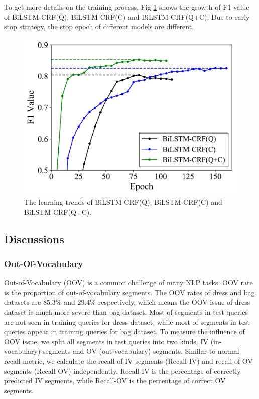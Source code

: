 To get more details on the training process, Fig \ref{fig:curve} shows the growth of F1 value of BiLSTM-CRF(Q), BiLSTM-CRF(C) and BiLSTM-CRF(Q+C). Due to early stop strategy, the stop epoch of different models are different.

\begin{figure}[th]
	\centering
	\includegraphics[width=0.8\columnwidth]{figures/result-1.pdf}
	\caption{\small The learning trends of BiLSTM-CRF(Q), BiLSTM-CRF(C) and BiLSTM-CRF(Q+C).}
	\label{fig:curve}
	\vspace{-10pt}
\end{figure}


\subsection{Discussions}

\subsubsection{Out-Of-Vocabulary}
\label{sec:oov}

Out-of-Vocabulary (OOV) is a common challenge of many NLP tasks. OOV rate is the proportion of out-of-vocabulary segments. The OOV rates of dress and bag datasets are $85.3\%$ and $29.4\%$ respectively, which means the OOV issue of dress dataset is much more severe than bag dataset. Most of segments in test queries are not seen in training queries for dress dataset, while most of segments in test queries appear in training queries for bag dataset. To measure the influence of OOV issue, we split all segments in test queries into two kinds, IV (in-vocabulary) segments and OV (out-vocabulary) segments. Similar to normal recall metric, we calculate the recall of IV segments (Recall-IV) and recall of OV segments (Recall-OV) independently. Recall-IV is the percentage of correctly predicted IV segments, while Recall-OV is the percentage of correct OV segments.

